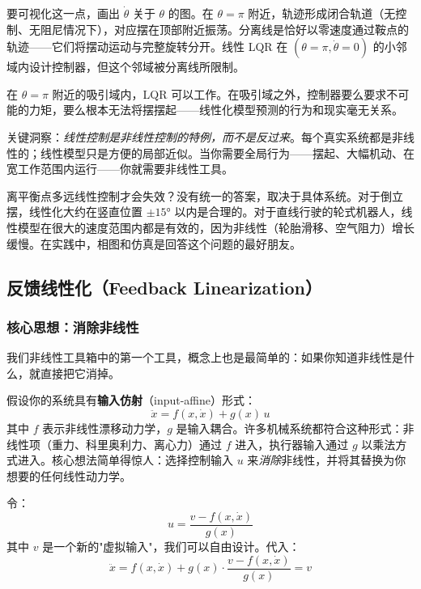 要可视化这一点，画出 $\dot{\theta}$ 关于 $\theta$ 的图。在 $\theta = \pi$ 附近，轨迹形成闭合轨道（无控制、无阻尼情况下），对应摆在顶部附近振荡。分离线是恰好以零速度通过鞍点的轨迹——它们将摆动运动与完整旋转分开。线性 LQR 在 $(\theta = \pi, \dot{\theta} = 0)$ 的小邻域内设计控制器，但这个邻域被分离线所限制。

在 $\theta = \pi$ 附近的吸引域内，LQR 可以工作。在吸引域之外，控制器要么要求不可能的力矩，要么根本无法将摆摆起——线性化模型预测的行为和现实毫无关系。

关键洞察：\textit{线性控制是非线性控制的特例，而不是反过来}。每个真实系统都是非线性的；线性模型只是方便的局部近似。当你需要全局行为——摆起、大幅机动、在宽工作范围内运行——你就需要非线性工具。

离平衡点多远线性控制才会失效？没有统一的答案，取决于具体系统。对于倒立摆，线性化大约在竖直位置 $\pm 15°$ 以内是合理的。对于直线行驶的轮式机器人，线性模型在很大的速度范围内都是有效的，因为非线性（轮胎滑移、空气阻力）增长缓慢。在实践中，相图和仿真是回答这个问题的最好朋友。

\subsection{反馈线性化（Feedback Linearization）}

\subsubsection{核心思想：消除非线性}

我们非线性工具箱中的第一个工具，概念上也是最简单的：如果你知道非线性是什么，就直接把它消掉。

假设你的系统具有\textbf{输入仿射}（input-affine）形式：
\begin{equation}
\ddot{x} = f(x, \dot{x}) + g(x)\,u
\end{equation}
其中 $f$ 表示非线性漂移动力学，$g$ 是输入耦合。许多机械系统都符合这种形式：非线性项（重力、科里奥利力、离心力）通过 $f$ 进入，执行器输入通过 $g$ 以乘法方式进入。核心想法简单得惊人：选择控制输入 $u$ 来\textit{消除}非线性，并将其替换为你想要的任何线性动力学。

令：
\begin{equation}
u = \frac{v - f(x, \dot{x})}{g(x)}
\end{equation}
其中 $v$ 是一个新的"虚拟输入"，我们可以自由设计。代入：
\begin{equation}
\ddot{x} = f(x, \dot{x}) + g(x) \cdot \frac{v - f(x, \dot{x})}{g(x)} = v
\end{equation}

